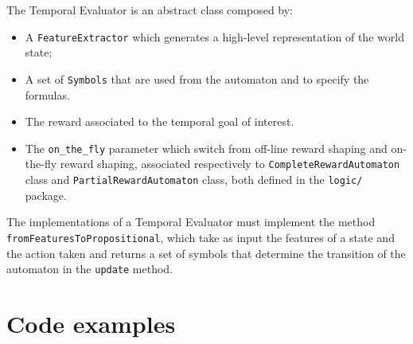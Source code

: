 The Temporal Evaluator is an abstract class composed by:
\begin{itemize}
	\item A \texttt{FeatureExtractor} which generates a high-level representation of the world state;
	\item A set of \texttt{Symbols} that are used from the automaton and to specify the formulas.
	\item The reward associated to the temporal goal of interest.
	\item The \texttt{on\_the\_fly} parameter which switch from off-line reward shaping and on-the-fly reward shaping, associated respectively to \texttt{CompleteRewardAutomaton} class and \texttt{PartialRewardAutomaton} class, both defined in the \texttt{logic/} package.
\end{itemize}

The implementations of a Temporal Evaluator must implement the method \texttt{fromFeaturesToPropositional}, which take as input the features of a state and the action taken and returns a set of symbols that determine the transition of the automaton in the \texttt{update} method.


\section{Code examples}
